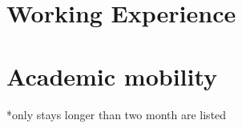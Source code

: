 \documentclass[11pt, a4paper]{awesome-cv}
\begin{document}
\hypertarget{working-experience}{%
\section{Working Experience}\label{working-experience}}

\begin{cventries}
\end{cventries}

\hypertarget{academic-mobility}{%
\section{Academic mobility}\label{academic-mobility}}

*only stays longer than two month are listed
\end{document}
